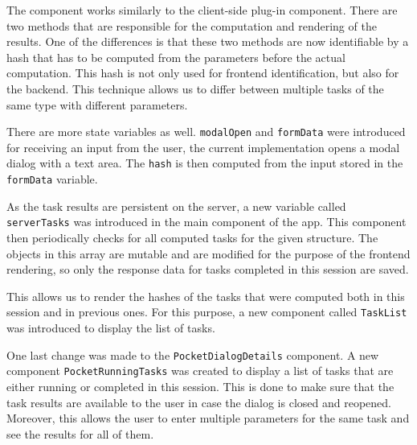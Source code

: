 The component works similarly to the client-side plug-in component. There are two methods that are responsible for the computation and rendering of the results. One of the differences is that these two methods are now identifiable by a hash that has to be computed from the parameters before the actual computation. This hash is not only used for frontend identification, but also for the backend. This technique allows us to differ between multiple tasks of the same type with different parameters.

There are more state variables as well. \texttt{modalOpen} and \texttt{formData} were introduced for receiving an input from the user, the current implementation opens a modal dialog with a text area. The \texttt{hash} is then computed from the input stored in the \texttt{formData} variable.

As the task results are persistent on the server, a new variable called \texttt{serverTasks} was introduced in the main component of the app. This component then periodically checks for all computed tasks for the given structure. The objects in this array are mutable and are modified for the purpose of the frontend rendering, so only the response data for tasks completed in this session are saved.

This allows us to render the hashes of the tasks that were computed both in this session and in previous ones. For this purpose, a new component called \texttt{TaskList} was introduced to display the list of tasks. 

One last change was made to the \texttt{PocketDialogDetails} component. A new component \texttt{PocketRunningTasks} was created to display a list of tasks that are either running or completed in this session. This is done to make sure that the task results are available to the user in case the dialog is closed and reopened. Moreover, this allows the user to enter multiple parameters for the same task and see the results for all of them.


